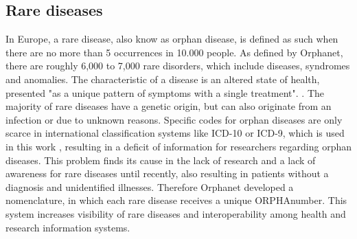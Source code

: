 \documentclass[11pt, a4paper]{book}
\begin{document}
\subsection{Rare diseases}
In Europe, a rare disease, also know as orphan disease, is defined as such when there are no more than 5 occurrences in 10.000 people. As defined by Orphanet, there are roughly 6,000 to 7,000 rare disorders, which include diseases, syndromes and anomalies. The characteristic of a disease is an altered state of health, presented "as a unique pattern of symptoms with a single treatment". \cite{Orphanet}. The majority of rare diseases have a genetic origin, but can also originate from an infection or due to unknown reasons. \cite{Orphanet} Specific codes for orphan diseases are only scarce in international classification systems like ICD-10 or ICD-9, which is used in this work \cite{rath2012representation}, resulting in a deficit of information  for researchers regarding orphan diseases. This problem finds its cause in the lack of research and a lack of awareness for rare diseases until recently, also resulting in patients without a diagnosis and unidentified illnesses. \cite{Orphanet}
Therefore Orphanet developed a nomenclature, in which each rare disease receives a unique ORPHAnumber. This system increases visibility of rare diseases and interoperability among health and research information systems. \cite{Orphanet}
\end{document}

